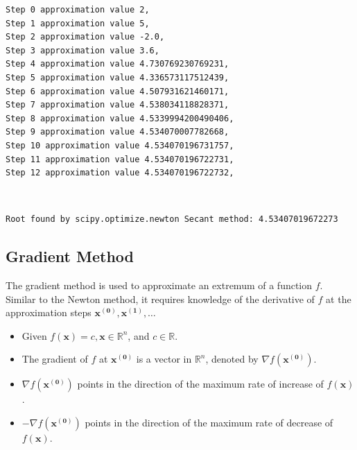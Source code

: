 \documentclass[11pt]{article}
\begin{document}
    \begin{Verbatim}[commandchars=\\\{\}]
Step 0 approximation value 2,
Step 1 approximation value 5,
Step 2 approximation value -2.0,
Step 3 approximation value 3.6,
Step 4 approximation value 4.730769230769231,
Step 5 approximation value 4.336573117512439,
Step 6 approximation value 4.507931621460171,
Step 7 approximation value 4.538034118828371,
Step 8 approximation value 4.5339994200490406,
Step 9 approximation value 4.534070007782668,
Step 10 approximation value 4.534070196731757,
Step 11 approximation value 4.534070196722731,
Step 12 approximation value 4.534070196722732,
    \end{Verbatim}

    \begin{center}
    \end{center}
    { \hspace*{\fill} \\}
    
    \begin{Verbatim}[commandchars=\\\{\}]
Root found by scipy.optimize.newton Secant method: 4.53407019672273
    \end{Verbatim}

    \newpage

\subsection{Gradient Method}\label{gradient-method}

The gradient method is used to approximate an extremum of a function
\(f\). Similar to the Newton method, it requires knowledge of the
derivative of \(f\) at the approximation steps
\(\pmb{x^{(0)}}, \pmb{x^{(1)}}, \ldots\)

\begin{itemize}
\item
  Given \(f(\pmb{x}) = c, \pmb{x} \in \mathbb{R}^n\), and
  \(c \in \mathbb{R}\).
\item
  The gradient of \(f\) at \(\pmb{x^{(0)}}\) is a vector in
  \(\mathbb{R}^n\), denoted by \(\nabla f(\pmb{x^{(0)}})\).
\item
  \(\nabla f(\pmb{x^{(0)}})\) points in the direction of the maximum
  rate of increase of \(f(\pmb{x})\).
\item
  \(-\nabla f(\pmb{x^{(0)}})\) points in the direction of the maximum
  rate of decrease of \(f(\pmb{x})\).
\end{itemize}
\end{document}

